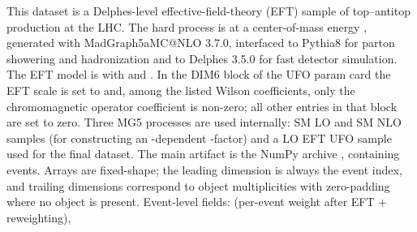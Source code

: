 \markdownRendererDocumentBegin
\markdownRendererSectionBegin
\markdownRendererSectionBegin
{}\markdownRendererInterblockSeparator
{}This dataset is a Delphes-level effective-field-theory (EFT) sample of top–antitop production at the LHC. The hard process is\markdownRendererParagraphSeparator
{}\markdownRendererParagraphSeparator
{}at a center-of-mass energy , generated with MadGraph5\markdownRendererUnderscore{}aMC@NLO 3.7.0, interfaced to Pythia8 for parton showering and hadronization and to Delphes 3.5.0 for fast detector simulation. The EFT model is  with  and . In the DIM6 block of the UFO param card the EFT scale is set to  and, among the listed Wilson coefficients, only the chromomagnetic operator coefficient  is non-zero; all other entries in that block are set to zero.\markdownRendererParagraphSeparator
{}Three MG5 processes are used internally: SM LO and SM NLO  samples (for constructing an -dependent -factor) and a LO EFT UFO  sample used for the final dataset.\markdownRendererInterblockSeparator
{}
\markdownRendererSectionEnd \markdownRendererSectionBegin
{}\markdownRendererInterblockSeparator
{}The main artifact is the NumPy archive\markdownRendererInterblockSeparator
{}\markdownRendererUlBeginTight
\markdownRendererUlItem {},\markdownRendererUlItemEnd 
\markdownRendererUlEndTight \markdownRendererInterblockSeparator
{}containing  events. Arrays are fixed-shape; the leading dimension is always the event index, and trailing dimensions correspond to object multiplicities with zero-padding where no object is present.\markdownRendererParagraphSeparator
{}Event-level fields:\markdownRendererInterblockSeparator
{}\markdownRendererUlBeginTight
\markdownRendererUlItem {} (per-event weight after EFT +  reweighting),\markdownRendererUlItemEnd 
